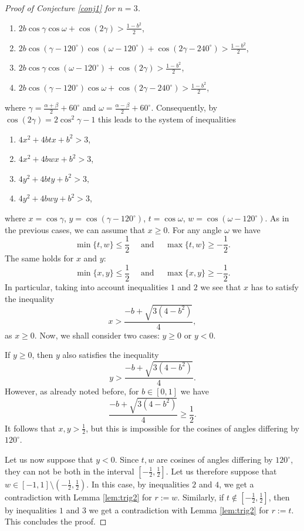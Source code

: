 \documentclass[12pt, a4paper]{article}
\theoremstyle{plain} %
\theoremstyle{definition} %
\theoremstyle{remark} %
\begin{document}
\begin{proof}[Proof of Conjecture \ref{conj1} for $n=3$]
\begin{enumerate}
\item $2b \cos \gamma \cos \omega  + \cos(2 \gamma) > \frac{1-b^2}{2}$,
\item $2b \cos \left ( \gamma - 120^{\circ} \right ) \cos (\omega - 120^{\circ}) + \cos(2\gamma - 240^{\circ}) > \frac{1-b^2}{2}$,
\item $2b \cos \gamma \cos \left  (\omega - 120^{\circ} \right ) + \cos(2 \gamma) > \frac{1-b^2}{2}$,
\item $2b \cos (\gamma-120^{\circ}) \cos \omega + \cos(2 \gamma-240^{\circ}) > \frac{1-b^2}{2}$,
\end{enumerate}
where $\gamma = \frac{\alpha+\beta}{2} + 60^{\circ}$ and $\omega = \frac{\alpha - \beta}{2} + 60^{\circ}$. Consequently, by $\cos(2 \gamma) = 2\cos^2 \gamma - 1$ this leads to the system of inequalities
\begin{enumerate}
\item $4x^2 + 4btx + b^2 > 3$,
\item $4x^2 + 4bwx + b^2 > 3$,
\item $4y^2 + 4bty + b^2 > 3,$
\item $4y^2 + 4bwy + b^2 > 3$,
\end{enumerate}
where $x = \cos \gamma$, $y = \cos(\gamma - 120^{\circ})$, $t=\cos \omega$, $w=\cos (\omega-120^{\circ})$. As in the previous cases, we can assume that $x \geq 0$. For any angle $\omega$ we have
$$\min\{t, w\} \leq \frac{1}{2} \quad \text{ and } \quad \max\{t, w\} \geq -\frac{1}{2}.$$
The same holds for $x$ and $y$:
$$\min\{x, y\} \leq \frac{1}{2} \quad \text{ and } \quad \max\{x, y\} \geq -\frac{1}{2}.$$
In particular, taking into account inequalities $1$ and $2$ we see that $x$ has to satisfy the inequality
\begin{equation}
\label{ineqx2}
x > \frac{-b+\sqrt{3(4-b^2)}}{4},
\end{equation}
as $x \geq 0$. Now, we shall consider two cases: $y \geq 0$ or $y<0$.

If $y \geq 0$, then $y$ also satisfies the inequality
$$y > \frac{-b+\sqrt{3(4-b^2)}}{4}.$$
However, as already noted before, for $b \in [0, 1]$ we have
$$\frac{-b+\sqrt{3(4-b^2)}}{4} \geq \frac{1}{2}.$$
It follows that $x, y>\frac{1}{2}$, but this is impossible for the cosines of angles differing by $120^{\circ}$.

Let us now suppose that $y<0$. Since $t, w$ are cosines of angles differing by $120^{\circ}$, they can not be both in the interval $\left [ - \frac{1}{2}, \frac{1}{2} \right ]$. Let us therefore suppose that $w \in [-1, 1] \setminus \left ( -\frac{1}{2}, \frac{1}{2} \right )$. In this case, by inequalities $2$ and $4$, we get a contradiction with Lemma \ref{lem:trig2} for $r:=w$. Similarly, if $t \not \in \left [-\frac{1}{2}, \frac{1}{2} \right ]$, then by inequalities $1$ and $3$ we get a contradiction with Lemma \ref{lem:trig2} for $r:=t$. This concludes the proof.


\end{proof}
\end{document}
